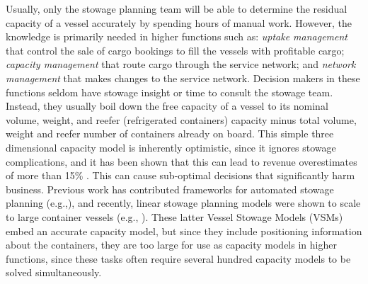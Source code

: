 \documentclass{llncs}
\begin{document}
Usually, only the stowage planning team will be able to determine the residual capacity of a vessel accurately by spending hours of manual work. 
However, the knowledge is primarily needed in higher functions such as: {\em uptake management} that control the sale of cargo bookings to fill the vessels with profitable cargo; {\em capacity management} that route cargo through the service network; and {\em network management} that makes changes to the service network. Decision makers in these functions seldom have stowage insight or time to consult the stowage team. Instead, they usually boil down the free capacity of a vessel to its nominal volume, weight, and reefer (refrigerated containers) capacity minus total volume, weight and reefer number of containers already on board. This simple three dimensional capacity model is inherently optimistic, since it ignores stowage complications, and it has been shown that this can lead to revenue overestimates of more than 15\% \cite{AlbertosThesis}. This can cause sub-optimal decisions that significantly harm business. 
Previous work has contributed frameworks for automated stowage planning (e.g.,\cite{roach00,kimkang02,ambrosino04,pacino11}), and recently, linear stowage planning models were shown to scale to large container vessels (e.g., \cite{AlbertosThesis}). These latter Vessel Stowage Models (VSMs) embed an accurate capacity model, but since they include positioning information about the containers, they are too large for use as capacity models in higher functions, since these tasks often require several hundred capacity models to be solved simultaneously.
\end{document}
